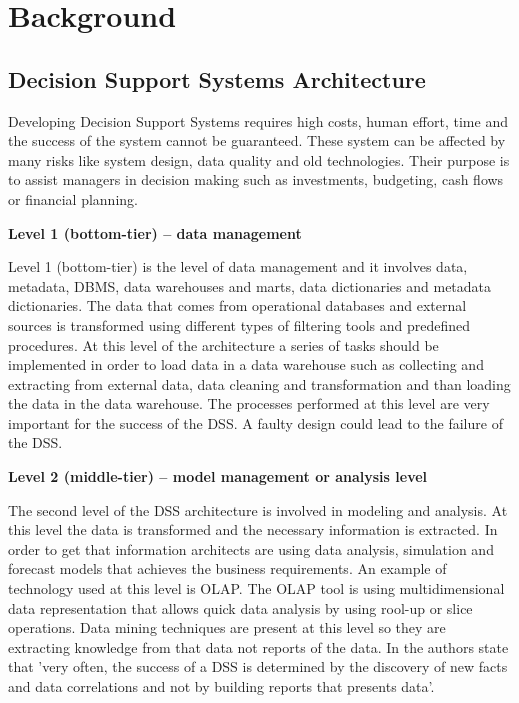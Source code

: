 \chapter{Background}
\label{chapter:chapter2}

\section{Decision Support Systems Architecture}
\label{sec:ch3-sec}
Developing Decision Support Systems requires high costs, human effort, time and the success of the system cannot be guaranteed. These system can be affected by many risks like system design, data quality and old technologies. Their purpose is to assist managers in decision making such as investments, budgeting, cash flows or financial planning.

\textbf{Level 1 (bottom-tier) – data management}

Level 1 (bottom-tier) is the level of data management and it involves data, metadata, DBMS, data warehouses and marts, data dictionaries and metadata dictionaries.
The data that comes from operational databases and external sources is transformed using different types of filtering tools and predefined procedures.
At this level of the architecture a series of tasks should be implemented in order to load data in a data warehouse such as collecting and extracting from external data, data cleaning and transformation and than loading the data in the data warehouse.
The processes performed at this level are very important for the success of the DSS. A faulty design could lead to the failure of the DSS.

\textbf{Level 2 (middle-tier) – model management or analysis level}

The second level of the DSS architecture is involved in modeling and analysis. At this level the data is transformed and the necessary information is extracted. In order to get that information architects are using data analysis, simulation and forecast models that achieves the business requirements. An example of technology used at this level is OLAP. The OLAP tool is using multidimensional data representation that allows quick data analysis by using rool-up or slice operations.
Data mining techniques are present at this level so they are extracting knowledge from that data not reports of the data.
In \cite{39029} the authors state that 'very often, the success of a DSS is determined by the discovery of new facts and data correlations and not by building reports that presents data'.

